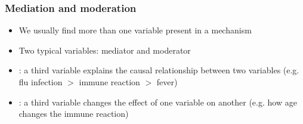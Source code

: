 \documentclass[aspectratio=43]{beamer}
\begin{document}
\begin{frame}
\frametitle{Mediation and moderation}
\centering

\begin{itemize}
\item We usually find more than one variable present in a mechanism
\item Two typical variables: mediator and moderator
\item {}: a third variable explains the causal relationship between two variables (e.g. flu infection $>$ immune reaction $>$ fever)
\item {}: a third variable changes the effect of one variable on another (e.g. how age changes the immune reaction)
\end{itemize}

\end{frame}
\end{document}
